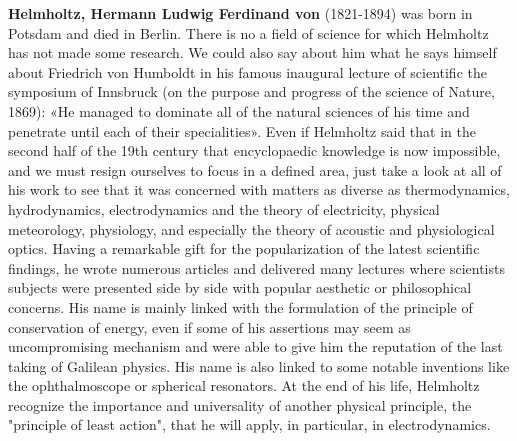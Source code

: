 \textbf{Helmholtz, Hermann Ludwig Ferdinand von} (1821-1894) was born in Potsdam and died in Berlin. There is no a field of science for which Helmholtz has not made some research. We could also say about him what he says himself about Friedrich von Humboldt in his famous inaugural lecture of scientific the symposium of Innsbruck (on the purpose and progress of the science of Nature, 1869): «He managed to dominate all of the natural sciences of his time and penetrate until each of their specialities». Even if Helmholtz said that in the second half of the 19th century that encyclopaedic knowledge is now impossible, and we must resign ourselves to focus in a defined area, just take a look at all of his work to see that it was concerned with matters as diverse as thermodynamics, hydrodynamics, electrodynamics and the theory of electricity, physical meteorology, physiology, and especially the theory of acoustic and physiological optics. Having a remarkable gift for the popularization of the latest scientific findings, he wrote numerous articles and delivered many lectures where scientists subjects were presented side by side with popular aesthetic or philosophical concerns. His name is mainly linked with the formulation of the principle of conservation of energy, even if some of his assertions may seem as uncompromising mechanism and were able to give him the reputation of the last taking of Galilean physics. His name is also linked to some notable inventions like the ophthalmoscope or spherical resonators. At the end of his life, Helmholtz recognize the importance and universality of another physical principle, the "principle of least action", that he will apply, in particular, in electrodynamics.

